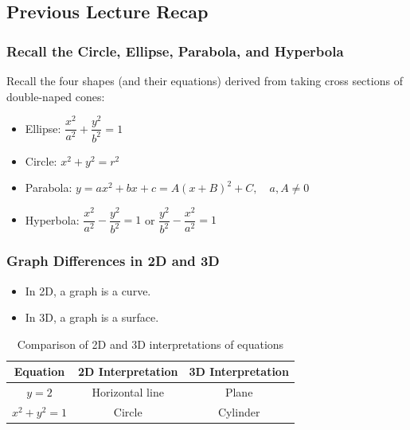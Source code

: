 \documentclass{article}
\begin{document}
\cleardoublepage
{}


\normalsize

\setcounter{page}{1}

\subsection*{Previous Lecture Recap}

\subsubsection*{Recall the Circle, Ellipse, Parabola, and Hyperbola}

Recall the four shapes (and their equations) derived from taking cross sections of double-naped cones:
\begin{itemize}
    \item Ellipse: \(\dfrac{x^2}{a^2} + \dfrac{y^2}{b^2} = 1\)
    \item Circle: \(x^2 + y^2 = r^2\)
    \item Parabola: \( y = ax^2 + bx + c = A(x + B)^2 + C, \quad a, A \neq 0 \)
    \item Hyperbola: \(\dfrac{x^2}{a^2} - \dfrac{y^2}{b^2} = 1\) or \(\dfrac{y^2}{b^2} - \dfrac{x^2}{a^2} = 1\)
\end{itemize}
\subsubsection*{Graph Differences in 2D and 3D}

\begin{itemize}
    \item In 2D, a graph is a curve.
    \item In 3D, a graph is a surface.
\end{itemize}
\begin{conceptbox}
    \begin{table}[H]
        \centering
        \renewcommand{\arraystretch}{1.5}
        \begin{tabular}{|c|c|c|}
            \hline
            \textbf{Equation} & \textbf{2D Interpretation} & \textbf{3D Interpretation} \\ \hline
            \( y = 2 \) & Horizontal line & Plane \\ \hline
            \( x^2 + y^2 = 1 \) & Circle & Cylinder \\ \hline
        \end{tabular}
        \caption{Comparison of 2D and 3D interpretations of equations}
    \end{table}    
\end{conceptbox}
\end{document}
